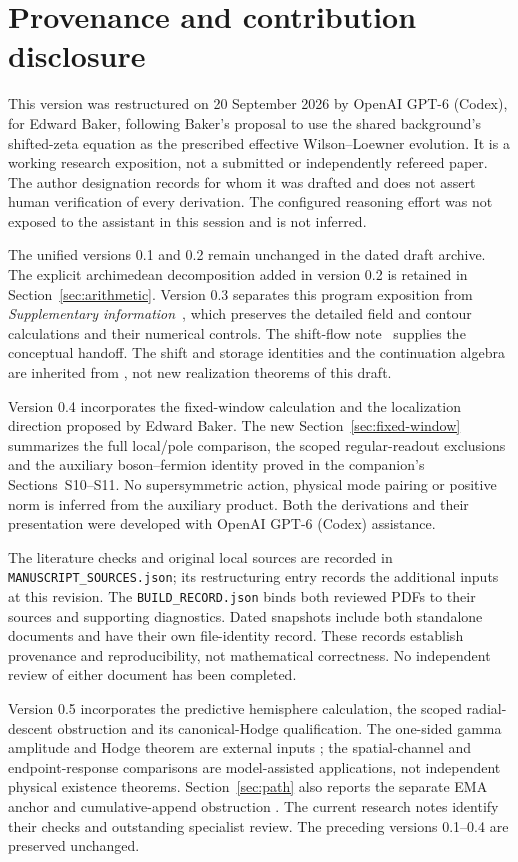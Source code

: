 \section{Provenance and contribution disclosure}\label{app:provenance}

This version was restructured on 20 September 2026 by OpenAI GPT-6
(Codex), for Edward Baker, following Baker's proposal to use the
shared background's shifted-zeta equation as the prescribed
effective Wilson--Loewner evolution. It is a working research
exposition, not a submitted or independently refereed paper.
The author designation records for whom it was drafted and does
not assert human verification of every derivation. The configured
reasoning effort was not exposed to the assistant in this session
and is not inferred.

The unified versions 0.1 and 0.2 remain unchanged in the dated
draft archive. The explicit archimedean decomposition added in
version 0.2 is retained in Section~\ref{sec:arithmetic}.
Version 0.3 separates this program exposition from
\emph{Supplementary information}~\cite{Supplement}, which preserves
the detailed field and contour calculations and their numerical
controls. The shift-flow note~\cite{ShiftFlowNote} supplies the
conceptual handoff. The shift and storage identities and the
continuation algebra are inherited from
\cite{SharedBackground,AdaptivePath,CumulativePath}, not new
realization theorems of this draft.

Version 0.4 incorporates the fixed-window calculation and the
localization direction proposed by Edward Baker. The new
Section~\ref{sec:fixed-window} summarizes the full local/pole
comparison, the scoped regular-readout exclusions and the auxiliary
boson--fermion identity proved in the companion's Sections~S10--S11.
No supersymmetric action, physical mode pairing or positive norm is
inferred from the auxiliary product. Both the derivations and their
presentation were developed with OpenAI GPT-6 (Codex) assistance.

The literature checks and original local sources are recorded in
\nolinkurl{MANUSCRIPT_SOURCES.json}; its restructuring entry records
the additional inputs at this revision. The
\nolinkurl{BUILD_RECORD.json} binds both reviewed PDFs to their
sources and supporting diagnostics. Dated snapshots include both
standalone documents and have their own file-identity record.
These records establish provenance and reproducibility, not
mathematical correctness. No independent review of either document
has been completed.

Version 0.5 incorporates the predictive hemisphere calculation,
the scoped radial-descent obstruction and its canonical-Hodge
qualification. The one-sided gamma amplitude and Hodge theorem are
external inputs \cite{DPYHiggs,DedushenkoGluing}; the spatial-channel
and endpoint-response comparisons are model-assisted applications,
not independent physical existence theorems. Section~\ref{sec:path}
also reports the separate EMA anchor and cumulative-append
obstruction \cite{EMAAnchor,CumulativeAppend}. The current research
notes identify their checks and outstanding specialist review.
The preceding versions 0.1--0.4 are preserved unchanged.
